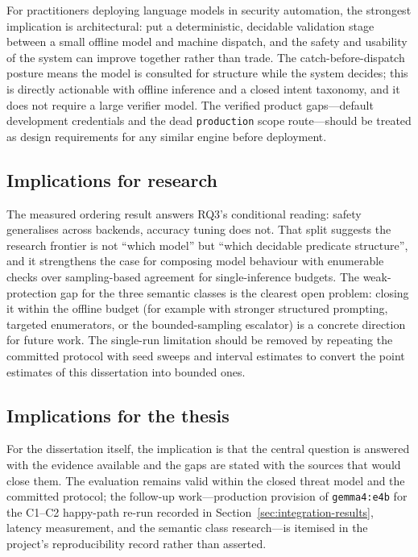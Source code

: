 For practitioners deploying language models in security automation, the
strongest implication is architectural: put a deterministic, decidable
validation stage between a small offline model and machine dispatch, and the
safety and usability of the system can improve together rather than trade. The
catch-before-dispatch posture means the model is consulted for structure while
the system decides; this is directly actionable with offline inference and a
closed intent taxonomy, and it does not require a large verifier model. The
verified product gaps---default development credentials and the dead
\texttt{production} scope route---should be treated as design requirements for
any similar engine before deployment.

\subsection*{Implications for research}

The measured ordering result answers RQ3's conditional reading: safety
generalises across backends, accuracy tuning does not. That split suggests the
research frontier is not ``which model'' but ``which decidable predicate
structure'', and it strengthens the case for composing model behaviour with
enumerable checks over sampling-based agreement for single-inference budgets.
The weak-protection gap for the three semantic classes is the clearest open
problem: closing it within the offline budget (for example with stronger
structured prompting, targeted enumerators, or the bounded-sampling escalator)
is a concrete direction for future work. The single-run limitation should be
removed by repeating the committed protocol with seed sweeps and interval
estimates to convert the point estimates of this dissertation into bounded
ones.

\subsection*{Implications for the thesis}

For the dissertation itself, the implication is that the central question is
answered with the evidence available and the gaps are stated with the sources
that would close them. The evaluation remains valid within the closed threat
model and the committed protocol; the follow-up work---production provision
of \texttt{gemma4:e4b} for the C1--C2 happy-path re-run recorded in
Section~\ref{sec:integration-results}, latency measurement, and the semantic
class research---is itemised in the project's reproducibility record rather
than asserted.
